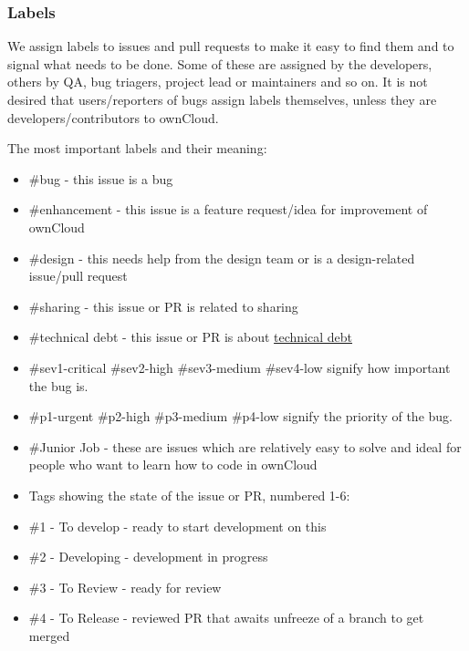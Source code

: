 \documentclass[letterpaper,10pt,english]{sphinxmanual}
\begin{document}
\subsubsection{Labels}
\label{general/codingguidelines:labels}
We assign labels to issues and pull requests to make it easy to find them and to signal what needs to be done. Some of these are assigned by the developers, others by QA, bug triagers, project lead or maintainers and so on. It is not desired that users/reporters of bugs assign labels themselves, unless they are developers/contributors to ownCloud.

The most important labels and their meaning:
\begin{itemize}
\item {} 
\#bug - this issue is a bug

\item {} 
\#enhancement - this issue is a feature request/idea for improvement of ownCloud

\item {} 
\#design - this needs help from the design team or is a design-related issue/pull request

\item {} 
\#sharing - this issue or PR is related to sharing

\item {} 
\#technical debt - this issue or PR is about \href{http://en.wikipedia.org/wiki/Technical\_debt}{technical debt}

\item {} 
\#sev1-critical \#sev2-high \#sev3-medium \#sev4-low signify how important the bug is.

\item {} 
\#p1-urgent \#p2-high \#p3-medium \#p4-low signify the priority of the bug.

\item {} 
\#Junior Job - these are issues which are relatively easy to solve and ideal for people who want to learn how to code in ownCloud

\item {} 
Tags showing the state of the issue or PR, numbered 1-6:

\end{itemize}
\begin{itemize}
\item {} 
\#1 - To develop - ready to start development on this

\item {} 
\#2 - Developing - development in progress

\item {} 
\#3 - To Review - ready for review

\item {} 
\#4 - To Release - reviewed PR that awaits unfreeze of a branch to get merged

\end{itemize}
\end{document}
